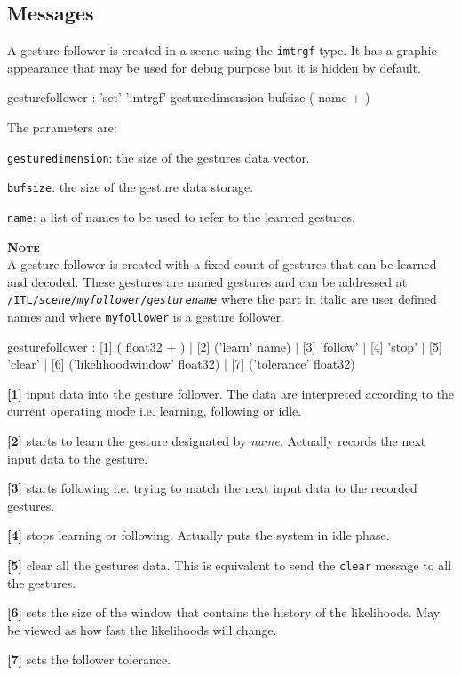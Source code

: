 \documentclass[a4paper,twoside]{report}
\newcommand{\subsublevel}[1]	{\subsection{#1}}
\newcommand{\OSC}[1]		{\texttt{#1}}
\newcommand{\note}	[1]		{\vspace{2mm}\textbf{\hspace{-0.9cm}\textbf{\textsc{Note #1}}}}
\let\olditemize\itemize
\let\oldenditemize\enditemize
\renewenvironment{itemize} 	{\olditemize \setlength{\itemsep}{1mm}}{\oldenditemize}
\begin{document}
\subsublevel{Messages}\label{gfmessages}
A gesture follower is created in a scene using the \OSC{imtrgf} type. It has a graphic appearance that may be used for debug purpose but it is hidden by default.

\begin{rail}
gesturefollower : 'set' 'imtrgf' gesturedimension bufsize ( name + )
\end{rail}

The parameters are:
\begin{itemize}
\item \OSC{gesturedimension}: the size of the gestures data vector.
\item \OSC{bufsize}: the size of the gesture data storage.
\item \OSC{name}: a list of names to be used to refer to the learned gestures.
\end{itemize}

\note{} \\
A gesture follower is created with a fixed count of gestures that can be learned and decoded. These gestures are named gestures and can be addressed at \OSC{/ITL/\textit{scene}/\textit{myfollower}/\textit{gesturename}} where the part in italic are user defined names and where \OSC{myfollower} is a gesture follower.


\begin{rail}
gesturefollower :
		  [1] ( float32 + )
		| [2] ('learn' name)
		| [3] 'follow'
		| [4] 'stop'
		| [5] 'clear'
		| [6] ('likelihoodwindow' float32)
		| [7] ('tolerance' float32)
\end{rail}

\begin{itemize}
\item \textbf{[1]} input data into the gesture follower. The data are interpreted according to the current operating mode i.e. learning, following or idle.
\item \textbf{[2]} starts to learn the gesture designated by \emph{name}. Actually records the next input data to the gesture. 
\item \textbf{[3]} starts following i.e. trying to match the next input data to the recorded gestures.
\item \textbf{[4]} stops learning or following. Actually puts the system in idle phase.
\item \textbf{[5]} clear all the gestures data. This is equivalent to send the \OSC{clear} message to all the gestures. 
\item \textbf{[6]} sets the size of the window that contains the history of the likelihoods. May be viewed as how fast the likelihoods	will change.
\item \textbf{[7]} sets the follower tolerance. 
\end{itemize}
\end{document}

